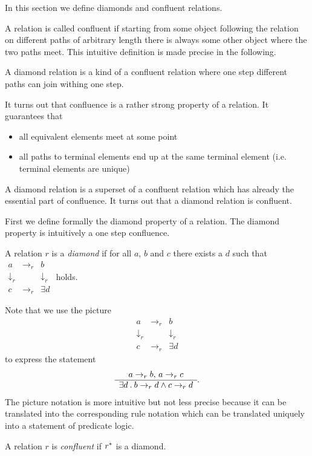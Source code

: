 In this section we define diamonds and confluent relations.

A relation is called confluent if starting from some object following the
relation on different paths of arbitrary length there is always some other
object where the two paths meet. This intuitive definition is made precise in
the following.

A diamond relation is a kind of a confluent relation where one step different
paths can join withing one step.

It turns out that confluence is a rather strong property of a relation. It
guarantees that
\begin{itemize}
\item all equivalent elements meet at some point
\item all paths to terminal elements end up at the same terminal
  element (i.e. terminal elements are unique)
\end{itemize}

A diamond relation is a superset of a confluent relation which has already the
essential part of confluence. It turns out that a diamond relation is confluent.

First we define formally the diamond property of a relation. The diamond
property is intuitively a one step confluence.

\begin{definition}
A relation $r$ is a \emph{diamond} if for all $a$, $b$ and $c$ there exists a $d$
such that
$
  \begin{matrix}
    a & \to_r & b \\
    \downarrow_r & & \downarrow_r \\
    c & \to_r & \exists d
  \end{matrix}
$ holds.
\end{definition}

\noindent Note that we use the picture
$$\begin{matrix}
  a & \to_r & b \\
  \downarrow_r & & \downarrow_r \\
  c & \to_r & \exists d
\end{matrix}$$ to express the statement
$$\begin{array}{c} a \to_r b, \, a \to_r c \\ \hline \exists d\mathbin. b\to_r d \land c\to_r
  d\end{array}.$$
%
The picture notation is more intuitive but not less precise because it can be
translated into the corresponding rule notation which can be translated
uniquely into a statement of predicate logic.

\begin{definition}
  A relation $r$ is \emph{confluent} if $r^*$ is a diamond.
\end{definition}

